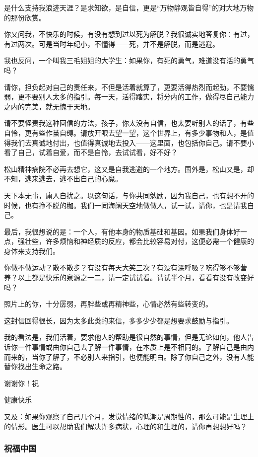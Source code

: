 \par 是什么支持我浪迹天涯？是求知欲，是自信，更是“万物静观皆自得”的对大地万物的那份欣赏。
\par 你又问我，不快乐的时候，有没有想到过以死为解脱？我很诚实地答复你：有过，有过两次。可是当时年纪小，不懂得——死，并不是解脱，而是逃避。
\par 我也反问，一个叫我三毛姐姐的大学生：如果你，有死的勇气，难道没有活的勇气吗？
\par 请你，担负起对自己的责任来，不但是活着就算了，更要活得热烈而起劲，不要懦弱，更不要别人太多的指引。每一天，活得踏实，将分内的工作，做得尽自己能力之内的完美，就无愧于天地。
\par 请不要怪责我这种回信的方法，孩子，你太没有自信，也太要听别人的话了，有些自怜，更有些作茧自缚。请放开眼去望一望，这个世界上，有多少事物和人，是值得我们去真诚地付出，也值得真诚地去投入——这里面，也包括你自己。请不要小看了自己，试着自爱，而不是自怜，去试试看，好不好？
\par 松山精神病院不必再去想它，这又是自我逃避的一个地方。国外是，松山又是，却不知，逃来逃去，逃不出自己的心魔。
\par 天下本无事，庸人自扰之。以这句话，与你共同勉励，因为我自己，也有想不开的时候，也有挣不脱的枷。我们一同海阔天空地做做人，试一试，请你，也是请我自己。
\par 最后，我很想说的是：一个人，有他本身的物质基础和基因。如果我们身体好一点，强壮些，许多烦恼和神经质的反应，都会比较容易对付，这便必需一个健康的身体来支持我们。
\par 你做不做运动？散不散步？有没有每天大笑三次？有没有深呼吸？吃得够不够营养？以上都是快乐的泉源之一二，请一定试试看。请试半个月，看看有没有改变好吗？
\par 照片上的你，十分孱弱，再胖些或再精神些，心情必然有些转变的。
\par 这封信回得很长，因为太多此类的来信，多多少少都是想要求鼓励与指引。
\par 我的看法是，我们活着，要求他人的帮助是很自然的事情，但是无论如何，他人告诉你一件事情或由你自己去了解一件事情，在本质上是不相同的。了解自己是由内而来的，当你了解了，不必别人来指引，也便能明白。除了你自己之外，没有人能替你找出生命之路。
\par 谢谢你！祝
\par 健康快乐
\par {}
\par 又及：如果你观察了自己几个月，发觉情绪的低潮是周期性的，那么可能是生理上的情形。医生可以帮助我们解决许多病状，心理的和生理的，请你再想想好吗？

\subsubsection{祝福中国}

